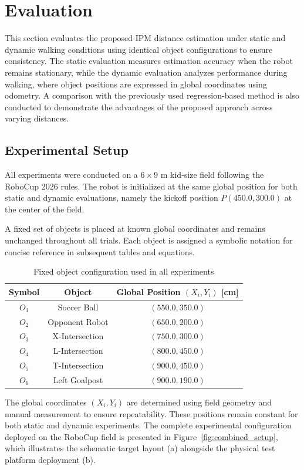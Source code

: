 \documentclass[journal]{IAENGtran}
\begin{document}
\section{Evaluation}

This section evaluates the proposed IPM distance estimation under static
and dynamic walking conditions using identical object configurations to ensure
consistency. The static evaluation measures estimation accuracy when the robot remains
stationary, while the dynamic evaluation analyzes performance during
walking, where object positions are expressed in global coordinates
using odometry. A comparison with the previously used regression-based
method is also conducted to demonstrate the advantages of the proposed
approach across varying distances.

\subsection{Experimental Setup}

All experiments were conducted on a $6 \times 9$ m kid-size field
following the RoboCup 2026 rules.
The robot is initialized at the same global position for both
static and dynamic evaluations, namely the kickoff position
$P(450.0, 300.0)$ at the center of the field.

A fixed set of objects is placed at known global coordinates
and remains unchanged throughout all trials.
Each object is assigned a symbolic notation for concise reference
in subsequent tables and equations.

\begin{table}[h]
\centering
\caption{Fixed object configuration used in all experiments}
\label{tab:object_setup}
\begin{tabular}{c c c}
\hline
Symbol & Object & Global Position $(X_i, Y_i)$ [cm] \\
\hline
$O_1$ & Soccer Ball & $(550.0, 350.0)$ \\
$O_2$ & Opponent Robot & $(650.0, 200.0)$ \\
$O_3$ & X-Intersection & $(750.0, 300.0)$ \\
$O_4$ & L-Intersection & $(800.0, 450.0)$ \\
$O_5$ & T-Intersection & $(900.0, 450.0)$ \\
$O_6$ & Left Goalpost & $(900.0, 190.0)$ \\
\hline
\end{tabular}
\end{table}

The global coordinates $(X_i, Y_i)$ are determined using field geometry
and manual measurement to ensure repeatability. These positions remain
constant for both static and dynamic experiments. The complete experimental
configuration deployed on the RoboCup field is presented in
Figure~\ref{fig:combined_setup}, which illustrates the schematic target layout
(a) alongside the physical test platform deployment (b).
\end{document}

